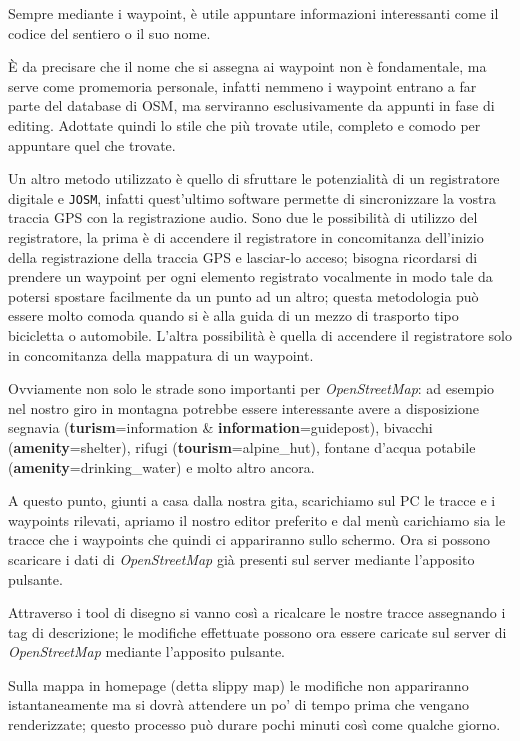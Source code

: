 \documentclass[a4paper,twoside,12pt,]{article}
\newcommand{\osm}{\emph{OpenStreetMap}\xspace}
\newcommand{\gps}{GPS\xspace}
\newcommand{\key}[1]{\textsf{\textbf{#1}}}
\newcommand{\val}[1]{\textsf{#1}}
\newcommand{\soft}[1]{\texttt{#1}}
\begin{document}
Sempre mediante i waypoint, è utile appuntare informazioni interessanti come il codice del sentiero o il suo nome.

È da precisare che il nome che si assegna ai waypoint non è fondamentale, ma serve come promemoria personale, infatti nemmeno i waypoint entrano a far parte del database di OSM, ma serviranno esclusivamente da appunti in fase di editing. Adottate quindi lo stile che più trovate utile, completo e comodo per appuntare quel che trovate.

Un altro metodo utilizzato è quello di sfruttare le potenzialità di un registratore digitale e \soft{JOSM}, infatti quest'ultimo software permette di sincronizzare la vostra traccia \gps con la registrazione audio. Sono due le possibilità di utilizzo del registratore, la prima è di accendere il registratore in concomitanza dell'inizio della registrazione della traccia \gps e lasciar-lo acceso; bisogna ricordarsi di prendere un waypoint per ogni elemento registrato vocalmente in modo tale da potersi spostare facilmente da un punto ad un altro; questa metodologia può essere molto comoda quando si è alla guida di un mezzo di trasporto tipo bicicletta o automobile. L'altra possibilità è quella di accendere il registratore solo in concomitanza della mappatura di un waypoint.

Ovviamente non solo le strade sono importanti per \osm: ad esempio nel nostro giro in montagna potrebbe essere interessante avere a disposizione segnavia (\key{turism}=\val{information} \& \key{information}=\val{guidepost}), bivacchi (\key{amenity}=\val{shelter}), rifugi (\key{tourism}=\val{alpine\_hut}), fontane d'acqua potabile (\key{amenity}=\val{drinking\_water}) e molto altro ancora.

A questo punto, giunti a casa dalla nostra gita, scarichiamo sul PC le tracce e i waypoints rilevati, apriamo il nostro editor preferito e dal menù carichiamo sia le tracce che i waypoints che quindi ci appariranno sullo schermo. Ora si possono scaricare i dati di \osm già presenti sul server mediante l'apposito pulsante.

Attraverso i tool di disegno si vanno così a ricalcare le nostre tracce assegnando i tag di descrizione; le modifiche effettuate possono ora essere caricate sul server di \osm mediante l'apposito pulsante.

Sulla mappa in homepage (detta slippy map) le modifiche non appariranno istantaneamente ma si dovrà attendere un po' di tempo prima che vengano renderizzate; questo processo può durare pochi minuti così come qualche giorno.
\end{document}
